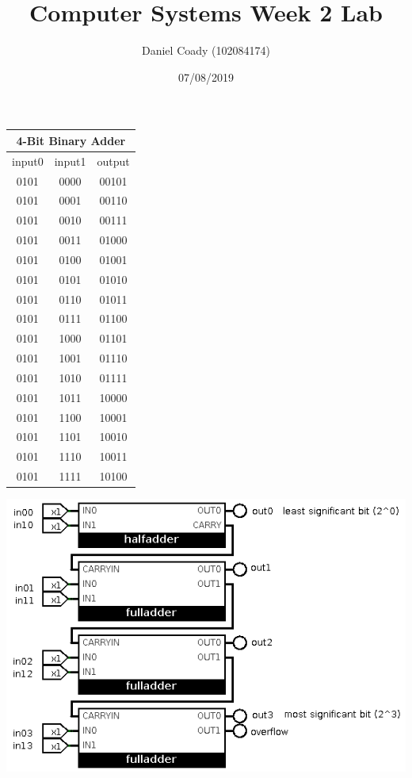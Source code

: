 \documentclass[11pt]{scrartcl}
\title{Computer Systems Week 2 Lab}
\author{Daniel Coady (102084174)}
\date{07/08/2019}
\begin{document}
\sffamily

\maketitle

\begin{center}
    \begin{tabular}{c c|c}
        \multicolumn{3}{c}{4-Bit Binary Adder} \\
        \hline
        input0 & input1 & output \\
        0101 & 0000 & 00101 \\
        0101 & 0001 & 00110 \\
        0101 & 0010 & 00111 \\
        0101 & 0011 & 01000 \\
        0101 & 0100 & 01001 \\
        0101 & 0101 & 01010 \\
        0101 & 0110 & 01011 \\
        0101 & 0111 & 01100 \\
        0101 & 1000 & 01101 \\
        0101 & 1001 & 01110 \\
        0101 & 1010 & 01111 \\
        0101 & 1011 & 10000 \\
        0101 & 1100 & 10001 \\
        0101 & 1101 & 10010 \\
        0101 & 1110 & 10011 \\
        0101 & 1111 & 10100 \\
    \end{tabular}

    \includegraphics[scale=0.5]{images/4bitadder.png}
\end{center}
\end{document}
